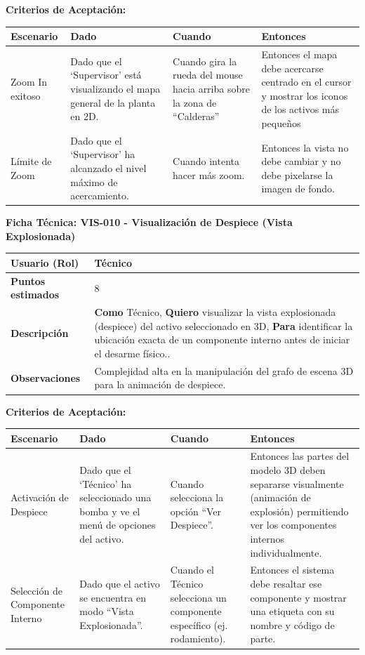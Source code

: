\noindent
\textbf{Criterios de Aceptación:}
\footnotesize
\begin{longtable}{|p{}|p{}|p{}|p{}|}
\hline
\textbf{Escenario} & \textbf{Dado} & \textbf{Cuando} & \textbf{Entonces} \\ \hline
\endhead
Zoom In exitoso & Dado que el `Supervisor' está visualizando el mapa general de la planta en 2D. & Cuando gira la rueda del mouse hacia arriba sobre la zona de ``Calderas'' & Entonces el mapa debe acercarse centrado en el cursor y mostrar los iconos de los activos más pequeños \\ \hline
Límite de Zoom & Dado que el `Supervisor' ha alcanzado el nivel máximo de acercamiento. & Cuando intenta hacer más zoom. & Entonces la vista no debe cambiar y no debe pixelarse la imagen de fondo. \\ \hline
\end{longtable}
\normalsize

\noindent
\textbf{Ficha Técnica: VIS-010 - Visualización de Despiece (Vista Explosionada)}
\footnotesize
\begin{longtable}{|p{}|p{}|}
\hline
\textbf{Usuario (Rol)} & Técnico \\ \hline
\textbf{Puntos estimados} & 8 \\ \hline
\textbf{Descripción} & \textbf{Como} Técnico, \textbf{Quiero} visualizar la vista explosionada (despiece) del activo seleccionado en 3D, \textbf{Para} identificar la ubicación exacta de un componente interno antes de iniciar el desarme físico.. \\ \hline
\textbf{Observaciones} & Complejidad alta en la manipulación del grafo de escena 3D para la animación de despiece. \\ \hline
\end{longtable}
\normalsize

\noindent
\textbf{Criterios de Aceptación:}
\footnotesize
\begin{longtable}{|p{}|p{}|p{}|p{}|}
\hline
\textbf{Escenario} & \textbf{Dado} & \textbf{Cuando} & \textbf{Entonces} \\ \hline
\endhead
Activación de Despiece & Dado que el `Técnico' ha seleccionado una bomba y ve el menú de opciones del activo. & Cuando selecciona la opción ``Ver Despiece''. & Entonces las partes del modelo 3D deben separarse visualmente (animación de explosión) permitiendo ver los componentes internos individualmente. \\ \hline
Selección de Componente Interno & Dado que el activo se encuentra en modo ``Vista Explosionada''. & Cuando el Técnico selecciona un componente específico (ej. rodamiento). & Entonces el sistema debe resaltar ese componente y mostrar una etiqueta con su nombre y código de parte. \\ \hline
\end{longtable}
\normalsize

